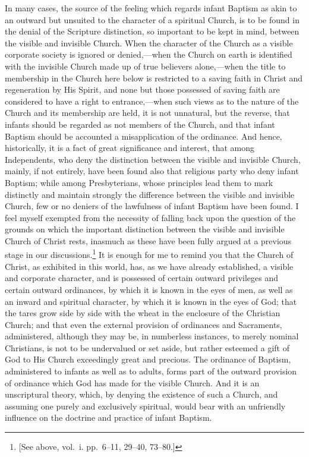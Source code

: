\documentclass[
]{book}
\begin{document}
In many cases, the source of the feeling which regards infant Baptism as akin to an outward but unsuited to the character of a spiritual Church, is to be found in the denial of the Scripture distinction, so important to be kept in mind, between the visible and invisible Church. When the character of the Church as a visible corporate society is ignored or denied,---when the Church on earth is identified with the invisible Church made up of true believers alone,---when the title to membership in the Church here below is restricted to a saving faith in Christ and regeneration by His Spirit, and none but those possessed of saving faith are considered to have a right to entrance,---when such views as to the nature of the Church and its membership are held, it is not unnatural, but the reverse, that infants should be regarded as not members of the Church, and that infant Baptism should be accounted a misapplication of the ordinance. And hence, historically, it is a fact of great significance and interest, that among Independents, who deny the distinction between the visible and invisible Church, mainly, if not entirely, have been found also that religious party who deny infant Baptism; while among Presbyterians, whose principles lead them to mark distinctly and maintain strongly the difference between the visible and invisible Church, few or no deniers of the lawfulness of infant Baptism have been found. I feel myself exempted from the necessity of falling back upon the question of the grounds on which the important distinction between the visible and invisible Church of Christ rests, inasmuch as these have been fully argued at a previous stage in our discussions.\footnote{{[}See above, vol.~i. pp.~6--11, 29--40, 73--80.{]}} It is enough for me to remind you that the Church of Christ, as exhibited in this world, has, as we have already established, a visible and corporate character, and is possessed of certain outward privileges and certain outward ordinances, by which it is known in the eyes of men, as well as an inward and spiritual character, by which it is known in the eyes of God; that the tares grow side by side with the wheat in the enclosure of the Christian Church; and that even the external provision of ordinances and Sacraments, administered, although they may be, in numberless instances, to merely nominal Christians, is not to be undervalued or set aside, but rather esteemed a gift of God to His Church exceedingly great and precious. The ordinance of Baptism, administered to infants as well as to adults, forms part of the outward provision of ordinance which God has made for the visible Church. And it is an unscriptural theory, which, by denying the existence of such a Church, and assuming one purely and exclusively spiritual, would bear with an unfriendly influence on the doctrine and practice of infant Baptism.
\end{document}
